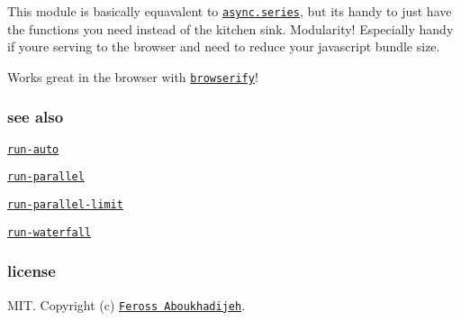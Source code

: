 This module is basically equavalent to \href{https://github.com/caolan/async#seriestasks-callback}{\tt {\ttfamily async.\+series}}, but it\textquotesingle{}s handy to just have the functions you need instead of the kitchen sink. Modularity! Especially handy if you\textquotesingle{}re serving to the browser and need to reduce your javascript bundle size.

Works great in the browser with \href{http://browserify.org/}{\tt browserify}!

\subsubsection*{see also}


\begin{DoxyItemize}
\item \href{https://github.com/feross/run-auto}{\tt run-\/auto}
\item \href{https://github.com/feross/run-parallel}{\tt run-\/parallel}
\item \href{https://github.com/feross/run-parallel-limit}{\tt run-\/parallel-\/limit}
\item \href{https://github.com/feross/run-waterfall}{\tt run-\/waterfall}
\end{DoxyItemize}

\subsubsection*{license}

M\+IT. Copyright (c) \href{http://feross.org}{\tt Feross Aboukhadijeh}. 